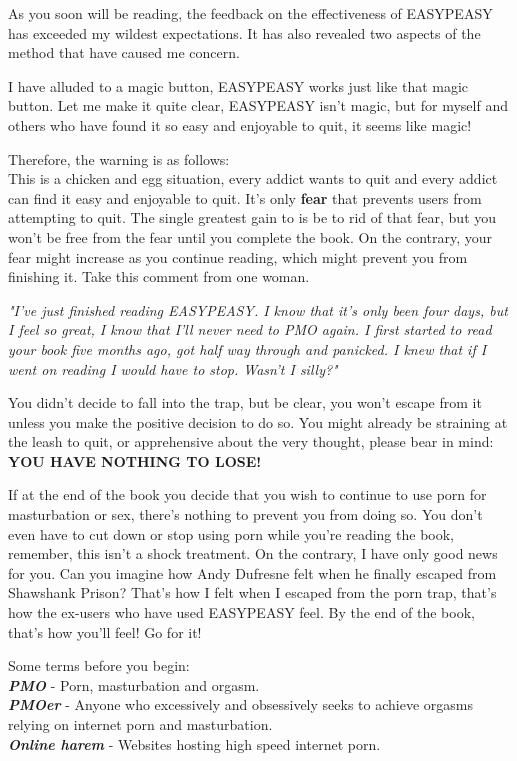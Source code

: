\documentclass[easypeasy.tex]{subfiles}
\begin{document}
As you soon will be reading, the feedback on the effectiveness of EASYPEASY has exceeded my wildest expectations. It has also revealed two aspects of the method that have caused me concern. 

I have alluded to a magic button, EASYPEASY works just like that magic button. Let me make it quite clear, EASYPEASY isn't magic, but for myself and others who have found it so easy and enjoyable to quit, it seems like magic!

Therefore, the warning is as follows:\\
This is a chicken and egg situation, every addict wants to quit and every addict can find it easy and enjoyable to quit. It's only \textbf{fear} that prevents users from attempting to quit. The single greatest gain to is be to rid of that fear, but you won't be free from the fear until you complete the book. On the contrary, your fear might increase as you continue reading, which might prevent you from finishing it. Take this comment from one woman.

\textit{\textit{"I've just finished reading EASYPEASY. I know that it's only been four days, but I feel so great, I know that I'll never need to PMO again. I first started to read your book five months ago, got half way through and panicked. I knew that if I went on reading I would have to stop. Wasn't I silly?"}}

You didn't decide to fall into the trap, but be clear, you won't escape from it unless you make the positive decision to do so. You might already be straining at the leash to quit, or apprehensive about the very thought, please bear in mind: 
\textbf{YOU HAVE NOTHING TO LOSE!}

If at the end of the book you decide that you wish to continue to use porn for masturbation or sex, there's nothing to prevent you from doing so. You don't even have to cut down or stop using porn while you're reading the book, remember, this isn't a shock treatment. On the contrary, I have only good news for you. Can you imagine how Andy Dufresne felt when he finally escaped from Shawshank Prison? That's how I felt when I escaped from the porn trap, that's how the ex-users who have used EASYPEASY feel. By the end of the book, that's how you'll feel! Go for it!

Some terms before you begin:\\
{\small \textbf{\textit{PMO}} - Porn, masturbation and orgasm.\\
  \textbf{\textit{PMOer}} - Anyone who excessively and obsessively seeks to achieve orgasms relying on internet porn and masturbation.\\
  \textbf{\textit{Online harem}} - Websites hosting high speed internet porn.
  }
\end{document}
